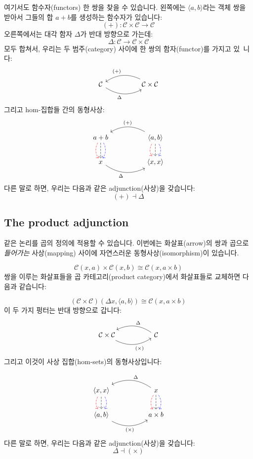 \documentclass[DaoFP]{subfiles}
\begin{document}
여기서도 함수자(functors) 한 쌍을 찾을 수 있습니다. 왼쪽에는 $\langle a, b \rangle$라는 객체 쌍을 받아서 그들의 합 $a + b$를 생성하는 함수자가 있습니다:
\[ (+) \colon \mathcal{C} \times \mathcal{C} \to \mathcal{C}\]
오른쪽에서는 대각 함자 $\Delta$가 반대 방향으로 가는데:
\[ \Delta \colon \mathcal{C} \to  \mathcal{C} \times \mathcal{C} \]
모두 합쳐서, 우리는 두 범주(category) 사이에 한 쌍의 함자(functor)를 가지고 있~니다:
\[
 \begin{tikzcd}
  \mathcal{C}
   \arrow[rr, bend right, "\Delta"']
  &&
  \mathcal{C} \times \mathcal{C}
 \arrow[ll, bend right, "(+)"']
  \end{tikzcd}
\]
그리고 hom-집합들 간의 동형사상:
\[
 \begin{tikzcd}
a + b
\arrow[d, bend right, red, dashed]
\arrow[d, dashed]
\arrow[d, bend left, blue, dashed]
  &&
 \langle a , b \rangle
\arrow[d, bend right, red, dashed]
\arrow[d, dashed]
\arrow[d, bend left, blue, dashed]
 \arrow[ll, bend right, "(+)"']
 \\
 x
   \arrow[rr, bend right, "\Delta"']
 &&
 \langle x, x \rangle
  \end{tikzcd}
\]
다른 말로 하면, 우리는 다음과 같은 adjunction(사상)을 갖습니다:
\[ (+) \dashv \Delta \]


\subsection{The product adjunction}

같은 논리를 곱의 정의에 적용할 수 있습니다. 이번에는 화살표(arrow)의 쌍과 곱으로 \emph{들어가는} 사상(mapping) 사이에 자연스러운 동형사상(isomorphism)이 있습니다.

\[  \mathcal{C} (x, a) \times \mathcal{C}(x, b) \cong  \mathcal{C} (x, a \times b)  \]
쌍을 이루는 화살표들을 곱 카테고리(product category)에서 화살표들로 교체하면 다음과 같습니다:

\[  (\mathcal{C} \times \mathcal{C})( \Delta x,  \langle a, b \rangle ) \cong  \mathcal{C} (x, a \times b)  \]
이 두 가지 펑터는 반대 방향으로 갑니다:
\[
 \begin{tikzcd}
  \mathcal{C} \times \mathcal{C}
  \arrow[rr, bend right, "(\times)"']
  &&
  \mathcal{C}
  \arrow[ll, bend right, "\Delta"']
  \end{tikzcd}
\]
그리고 이것이 사상 집합(hom-sets)의 동형사상입니다:

\[
 \begin{tikzcd}
 \langle x, x \rangle
\arrow[d, bend right, red, dashed]
\arrow[d, dashed]
\arrow[d, bend left, blue, dashed]
  &&
  x
\arrow[d, bend right, red, dashed]
\arrow[d, dashed]
\arrow[d, bend left, blue, dashed]
 \arrow[ll, bend right, "\Delta"']
 \\
 \langle a , b \rangle
   \arrow[rr, bend right, "(\times)"']
 &&
 a \times b
  \end{tikzcd}
\]
다른 말로 하면, 우리는 다음과 같은 adjunction(사상)을 갖습니다:
\[ \Delta \dashv (\times) \]
\end{document}
